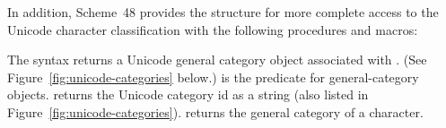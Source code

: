 In addition, Scheme~48 provides the  structure
for more complete access to the Unicode character classification with
the following procedures and macros:
%
\begin{protos}
\end{protos}
%
The syntax  returns a Unicode general category
object associated with .  (See
Figure~\ref{fig:unicode-categories} below.)  
is the predicate for general-category objects.
 returns the Unicode category id as a string
(also listed in Figure~\ref{fig:unicode-categories}).
 returns the general category of a character.

